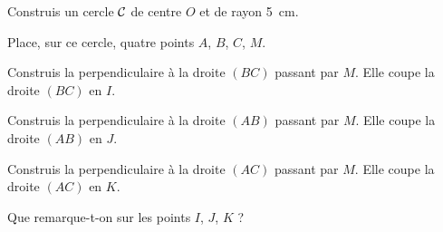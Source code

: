 \begin{myenumerate}
\item Construis un cercle $\cal C$ de centre $O$ et de rayon 5~cm.
\item Place, sur ce cercle, quatre points $A$, $B$, $C$, $M$.
\item Construis la perpendiculaire à la droite $(BC)$ passant par
$M$. Elle coupe la droite $(BC)$ en $I$.
\item Construis la perpendiculaire à la droite $(AB)$ passant par
$M$. Elle coupe la droite $(AB)$ en $J$.
\item Construis la perpendiculaire à la droite $(AC)$ passant par
$M$. Elle coupe la droite $(AC)$ en $K$.
\item Que remarque-t-on sur les points $I$, $J$, $K$ ?
\end{myenumerate}